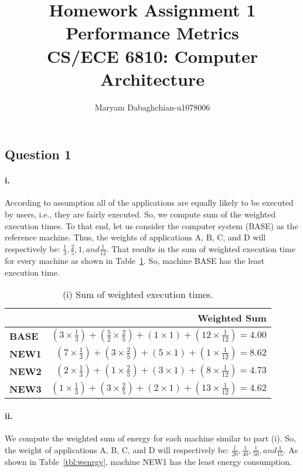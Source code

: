 \documentclass[11pt]{article}
\title{Homework Assignment 1\\
	Performance Metrics\\
	CS/ECE 6810: Computer Architecture}
\author{Maryam Dabaghchian-u1078006}
\newcommand{\q}[1]{\subsection*{Question {#1}}}
\renewcommand{\part}[1]{\paragraph*{{#1}.}}
\begin{document}
\maketitle

\q{1} 

\part{i} According to assumption all of the applications are equally likely to be 
executed by users, i.e., they are fairly executed. So, we compute sum of the 
weighted execution times. To that end, let us consider the computer system (BASE) 
as the reference machine. Thus, the weights of applications A, B, C, and D will 
respectively be: $\frac{1}{3}, \frac{2}{5}, 1, and \frac{1}{12}$. That results in 
the sum of weighted execution time for every machine as shown in 
Table~\ref{tbl:wext}. So, machine BASE has the least execution time. 

\begin{table}[h]
\center
\begin{tabular}{|l|r|}
	\hline
	 & \textbf{Weighted Sum} \\
	\hline
	\textbf{BASE} & $(3 \times \frac{1}{3}) + (\frac{5}{2} \times \frac{2}{5}) + 
	(1 \times 1) + (12 \times \frac{1}{12}) = 4.00$  \\
	\hline
	\textbf{NEW1} & $(7 \times \frac{1}{3}) + (3 \times \frac{2}{5}) + 
	(5 \times 1) + (1 \times \frac{1}{12}) = 8.62$ \\
	\hline
	\textbf{NEW2} & $(2 \times \frac{1}{3}) + (1 \times \frac{2}{5}) + 
	(3 \times 1) + (8 \times \frac{1}{12}) = 4.73$ \\
	\hline
	\textbf{NEW3} & $(1 \times \frac{1}{3}) + (3 \times \frac{2}{5}) + 
	(2 \times 1) + (13 \times \frac{1}{12}) = 4.62$ \\
	\hline
\end{tabular}
\caption{(i) Sum of weighted execution times.}
\label{tbl:wext}
\end{table}


\part{ii} We compute the weighted sum of energy for each machine similar to 
part (i). So, the weight of applications A, B, C, and D will respectively be: 
$\frac{1}{20}, \frac{1}{40}, \frac{1}{50}, and \frac{1}{15}$. As shown in 
Table~\ref{tbl:wenrgy}, machine NEW1 has the least energy consumption.
\end{document}
